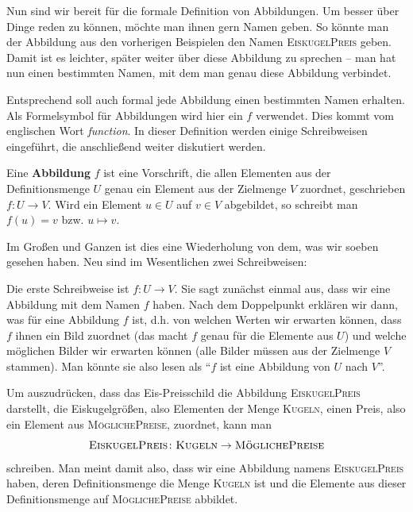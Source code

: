 \documentclass[../../main.tex]{subfiles}
\begin{document}
\label{sec:abbildungen_definition}
Nun sind wir bereit für die formale Definition von Abbildungen. Um besser über Dinge reden zu können, möchte man ihnen gern Namen geben. So könnte man der Abbildung aus den vorherigen Beispielen den Namen \textsc{EiskugelPreis} geben. Damit ist es leichter, später weiter über diese Abbildung zu sprechen -- man hat nun einen bestimmten Namen, mit dem man genau diese Abbildung verbindet.

Entsprechend soll auch formal jede Abbildung einen bestimmten Namen erhalten. Als Formelsymbol für Abbildungen wird hier ein $f$ verwendet. Dies kommt vom englischen Wort \emph{function}. In dieser Definition werden einige Schreibweisen eingeführt, die anschließend weiter diskutiert werden.

\begin{definition}[Abbildung]
Eine \textbf{Abbildung} $f$ ist eine Vorschrift, die allen Elementen aus der Definitionsmenge $U$ genau ein Element aus der Zielmenge $V$ zuordnet, geschrieben $f\colon U\rightarrow V$. Wird ein Element $u\in U$ auf $v\in V$ abgebildet, so schreibt man $f(u)=v$ bzw. $u\mapsto v$.
\end{definition}

Im Großen und Ganzen ist dies eine Wiederholung von dem, was wir soeben gesehen haben. Neu sind im Wesentlichen zwei Schreibweisen: 

Die erste Schreibweise ist \mbox{$f\colon U\rightarrow V$}. Sie sagt zunächst einmal aus, dass wir eine Abbildung mit dem Namen $f$ haben. Nach dem Doppelpunkt erklären wir dann, was für eine Abbildung $f$ ist, d.h. von welchen Werten wir erwarten können, dass $f$ ihnen ein Bild zuordnet (das macht $f$ genau für die Elemente aus $U$) und welche möglichen Bilder wir erwarten können (alle Bilder müssen aus der Zielmenge $V$ stammen). Man könnte sie also lesen als \enquote{$f$ ist eine Abbildung von $U$ nach $V$}.

\begin{example}{}
    Um auszudrücken, dass das Eis-Preisschild die Abbildung \textsc{EiskugelPreis} darstellt, die Eiskugelgrößen, also Elementen der Menge \textsc{Kugeln}, einen Preis, also ein Element aus \textsc{MöglichePreise}, zuordnet, kann man \[\textsc{EiskugelPreis}\colon\textsc{Kugeln}\rightarrow\textsc{MöglichePreise}\] schreiben. Man meint damit also, dass wir eine Abbildung namens \textsc{EiskugelPreis} haben, deren Definitionsmenge die Menge \textsc{Kugeln} ist und die Elemente aus dieser Definitionsmenge auf \textsc{MöglichePreise} abbildet.
\end{example}
\end{document}
